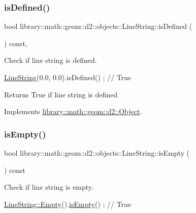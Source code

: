 \subsubsection{\texorpdfstring{is\+Defined()}{isDefined()}}
{\footnotesize\ttfamily bool library\+::math\+::geom\+::d2\+::objects\+::\+Line\+String\+::is\+Defined (\begin{DoxyParamCaption}{ }\end{DoxyParamCaption}) const\hspace{0.3cm}{\ttfamily [override]}, {\ttfamily [virtual]}}



Check if line string is defined. 


\begin{DoxyCode}
\hyperlink{classlibrary_1_1math_1_1geom_1_1d2_1_1objects_1_1_line_string_aa313a076051c7fb722b9eeb6d5bf2f7e}{LineString}(0.0, 0.0).isDefined() ; \textcolor{comment}{// True}
\end{DoxyCode}


\begin{DoxyReturn}{Returns}
True if line string is defined 
\end{DoxyReturn}


Implements \hyperlink{classlibrary_1_1math_1_1geom_1_1d2_1_1_object_ae9506254971168a3ca63e1923556b70d}{library\+::math\+::geom\+::d2\+::\+Object}.

\mbox{\label{classlibrary_1_1math_1_1geom_1_1d2_1_1objects_1_1_line_string_a4cdb4e69cd076285cb14356b86b41fcf}} 
\subsubsection{\texorpdfstring{is\+Empty()}{isEmpty()}}
{\footnotesize\ttfamily bool library\+::math\+::geom\+::d2\+::objects\+::\+Line\+String\+::is\+Empty (\begin{DoxyParamCaption}{ }\end{DoxyParamCaption}) const}



Check if line string is empty. 


\begin{DoxyCode}
\hyperlink{classlibrary_1_1math_1_1geom_1_1d2_1_1objects_1_1_line_string_af8a783642dc4ba67d4e0ca2140cda343}{LineString::Empty}().\hyperlink{classlibrary_1_1math_1_1geom_1_1d2_1_1objects_1_1_line_string_a4cdb4e69cd076285cb14356b86b41fcf}{isEmpty}() ; \textcolor{comment}{// True}
\end{DoxyCode}


